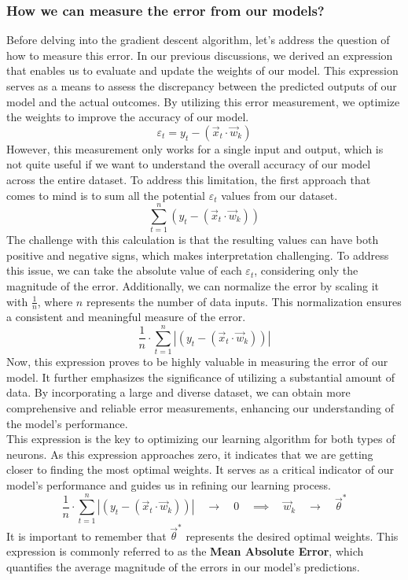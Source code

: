 \subsubsection{How we can measure the error from our models?}
Before delving into the gradient descent algorithm, let's address the question of how to measure this error.
In our previous discussions, we derived an expression that enables us to evaluate and update the weights of
our model. This expression serves as a means to assess the discrepancy between the predicted outputs of our
model and the actual outcomes. By utilizing this error measurement, we optimize the weights
to improve the accuracy of our model.
\[
\varepsilon_t = y_t - (\vec{x}_t \cdot \vec{w}_k)
\]
However, this measurement only works for a single input and output, which is not quite useful if we want to
understand the overall accuracy of our model across the entire dataset. To address this limitation, the
first approach that comes to mind is to sum all the potential $\varepsilon_t$ values from our dataset.
\[
\sum_{t = 1}^{n}(y_t - (\vec{x}_t \cdot \vec{w}_k))
\]
The challenge with this calculation is that the resulting values can have both positive and negative signs,
which makes interpretation challenging. To address this issue, we can take the absolute value of each
$\varepsilon_t$, considering only the magnitude of the error. Additionally, we can normalize the error
by scaling it with
$\frac{1}{n}$, where $n$ represents the number of data inputs. This normalization ensures a consistent and
meaningful measure of the error.
\[
\frac{1}{n} \cdot \sum_{t = 1}^{n}|(y_t - (\vec{x}_t \cdot \vec{w}_k))|
\]
Now, this expression proves to be highly valuable in measuring the error of our model. It further emphasizes
the significance of utilizing a substantial amount of data. By incorporating a large and diverse dataset, we
can obtain more comprehensive and reliable error measurements, enhancing our understanding of the model's
performance.\\

This expression is the key to optimizing our learning algorithm for both types of neurons. As this expression
approaches zero, it indicates that we are getting closer to finding the most optimal weights. It serves as a
critical indicator of our model's performance and guides us in refining our learning process.
\[
\frac{1}{n} \cdot \sum_{t = 1}^{n}|(y_t - (\vec{x}_t \cdot \vec{w}_k))|\quad \rightarrow \quad 0
\quad \implies \quad \vec{w}_k \quad \rightarrow \quad \vec{\theta}^*
\]
It is important to remember that $\vec{\theta}^*$ represents the desired optimal weights. This expression is
commonly referred to as the \textbf{Mean Absolute Error}, which quantifies the average magnitude of the errors
in our model's predictions.
